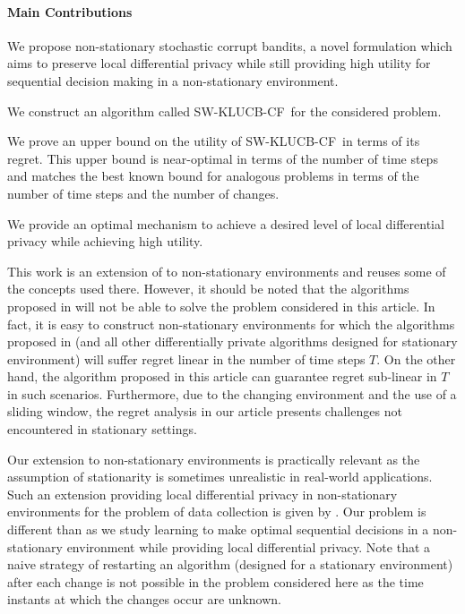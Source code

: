 \documentclass[letterpaper]{article} %
\newcommand{\SWKLUCBCF}{\textsc{SW-KLUCB-CF}}
\begin{document}
\paragraph{Main Contributions}
\item We propose non-stationary stochastic corrupt bandits, a novel formulation which aims to preserve local differential privacy while still providing high utility for sequential decision making in a non-stationary environment.
\item We construct an algorithm called \SWKLUCBCF \ for the considered problem.
\item We prove an upper bound on the utility of \SWKLUCBCF \ in terms of its regret. This upper bound is near-optimal in terms of the number of time steps and matches the best known bound for analogous problems in terms of the number of time steps and the number of changes.
\item We provide an optimal mechanism to achieve a desired level of local differential privacy while achieving high utility.

This work is an extension of \citet{pmlr-v83-gajane18a} to non-stationary environments and reuses some of the concepts used there. However, it should be noted that the algorithms proposed in \citet{pmlr-v83-gajane18a} will not be able to solve the problem considered in this article. In fact, it is easy to construct non-stationary environments for which the algorithms proposed in \citet{pmlr-v83-gajane18a} (and all other differentially private algorithms designed for stationary environment) will suffer regret linear in the number of time steps $T$. On the other hand, the algorithm proposed in this article can guarantee regret sub-linear in $T$ in such scenarios. Furthermore, due to the changing environment and the use of a sliding window, the regret analysis in our article presents challenges not encountered in stationary settings.

Our extension to non-stationary environments is practically relevant as the assumption of stationarity is sometimes unrealistic in real-world applications. Such an extension providing local differential privacy in non-stationary environments for the problem of data collection is given by \citet{NEURIPS2018_a0161022}. %
Our problem is different than \citet{NEURIPS2018_a0161022} as we study learning to make optimal sequential decisions in a non-stationary environment while providing local differential privacy.
Note that a naive strategy of restarting an algorithm (designed for a stationary environment) after each change is not possible in the problem considered here as the time instants at which the changes occur are unknown.
\end{document}

